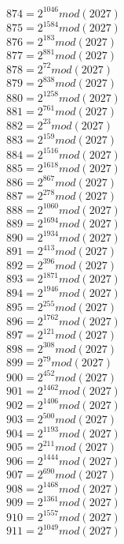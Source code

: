 \documentclass[12pt, letterpaper]{article}
\begin{document}
\begin{itemize}
\begin{multicols}{3}
$874= 2^{1046} mod (2027)$\\
$875= 2^{1584} mod (2027)$\\
$876= 2^{183} mod (2027)$\\
$877= 2^{881} mod (2027)$\\
$878= 2^{72} mod (2027)$\\
$879= 2^{838} mod (2027)$\\
$880= 2^{1258} mod (2027)$\\
$881= 2^{761} mod (2027)$\\
$882= 2^{23} mod (2027)$\\
$883= 2^{159} mod (2027)$\\
$884= 2^{1516} mod (2027)$\\
$885= 2^{1618} mod (2027)$\\
$886= 2^{867} mod (2027)$\\
$887= 2^{278} mod (2027)$\\
$888= 2^{1060} mod (2027)$\\
$889= 2^{1694} mod (2027)$\\
$890= 2^{1934} mod (2027)$\\
$891= 2^{413} mod (2027)$\\
$892= 2^{396} mod (2027)$\\
$893= 2^{1871} mod (2027)$\\
$894= 2^{1946} mod (2027)$\\
$895= 2^{255} mod (2027)$\\
$896= 2^{1762} mod (2027)$\\
$897= 2^{121} mod (2027)$\\
$898= 2^{308} mod (2027)$\\
$899= 2^{79} mod (2027)$\\
$900= 2^{452} mod (2027)$\\
$901= 2^{1462} mod (2027)$\\
$902= 2^{1406} mod (2027)$\\
$903= 2^{500} mod (2027)$\\
$904= 2^{1193} mod (2027)$\\
$905= 2^{211} mod (2027)$\\
$906= 2^{1444} mod (2027)$\\
$907= 2^{690} mod (2027)$\\
$908= 2^{1468} mod (2027)$\\
$909= 2^{1361} mod (2027)$\\
$910= 2^{1557} mod (2027)$\\
$911= 2^{1049} mod (2027)$\\

\end{multicols}
\end{itemize}
\end{document}
